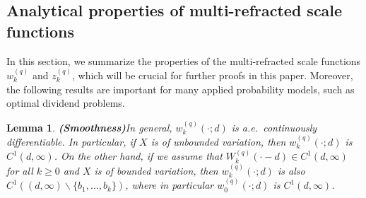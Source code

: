 \documentclass[12pt,reqno]{amsart}
\newtheorem{lemma}[theorem]{Lemma}
\theoremstyle{definition}
\theoremstyle{remark}
\begin{document}
\subsection{Analytical properties of multi-refracted scale functions}
In this section, we summarize the properties of the multi-refracted scale functions
  $w_k^{(q)}$ and $z_k^{(q)}$, which will be crucial for further proofs in this paper. Moreover, the following results
are important for many applied probability models, such as optimal dividend problems. 

\begin{lemma}{\textbf{(Smoothness)}}\label{Smoothness}
 In general,  $w_k^{(q)}(\cdot;d)$ is a.e.~continuously differentiable.
In particular, if $X$ is of unbounded variation, then $w_k^{(q)}(\cdot;d)$ is $C^1(d,\infty)$. 
 On the other hand, if we assume that $W_k^{(q)}(\cdot-d) \in C^1(d,\infty)$ for all $k \geq 0$ and $X$ is of bounded variation, 
then $w_k^{(q)}(\cdot;d)$ is also $C^1((d,\infty) \backslash \{ b_1, \ldots, b_k\})$, where in particular $w_0^{(q)}(\cdot;d)$ is $C^1(d,\infty)$. 
	\end{lemma}
\end{document}
